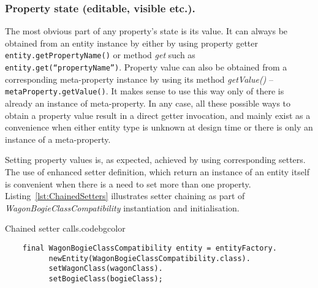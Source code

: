   \subsubsection*{Property state (editable, visible etc.).}
  The most obvious part of any property's state is its value.
  It can always be obtained from an entity instance by either by using property getter \texttt{entity.getPropertyName()} or method \emph{get} such as \texttt{entity.get(``propertyName'')}.
  Property value can also be obtained from a corresponding meta-property instance by using its method \emph{getValue()} -- \texttt{metaProperty.getValue()}.
  It makes sense to use this way only of there is already an instance of meta-property.
  In any case, all these possible ways to obtain a property value result in a direct getter invocation, and mainly exist as a convenience when either entity type is unknown at design time or there is only an instance of a meta-property.
  
  Setting property values is, as expected, achieved by using corresponding setters.
  The use of enhanced setter definition, which return an instance of an entity itself is convenient when there is a need to set more than one property.
  Listing~\ref{lst:ChainedSetters} illustrates setter chaining as part of \emph{WagonBogieClassCompatibility} instantiation and initialisation.

  \begin{code}{Chained setter calls.}{\label{lst:ChainedSetters}}{codebgcolor}
    \begin{lstlisting}
    final WagonBogieClassCompatibility entity = entityFactory.
		  newEntity(WagonBogieClassCompatibility.class).
		  setWagonClass(wagonClass).
		  setBogieClass(bogieClass);
    \end{lstlisting}
  \end{code}


